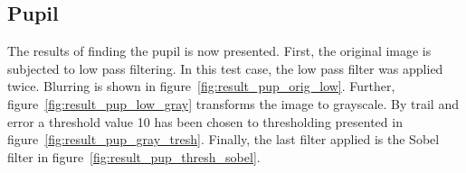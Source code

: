 \documentclass{article}
\begin{document}
\subsection{Pupil}
\label{sec:results_pupil}

The results of finding the pupil is now presented. First, the original image is subjected to low pass filtering. In this test case, the low pass filter was applied twice. Blurring is shown in figure~\ref{fig:result_pup_orig_low}. Further, figure~\ref{fig:result_pup_low_gray} transforms the image to grayscale. By trail and error a threshold value 10 has been chosen to thresholding presented in figure~\ref{fig:result_pup_gray_tresh}. Finally, the last filter applied is the Sobel filter in figure~\ref{fig:result_pup_thresh_sobel}.
\end{document}
